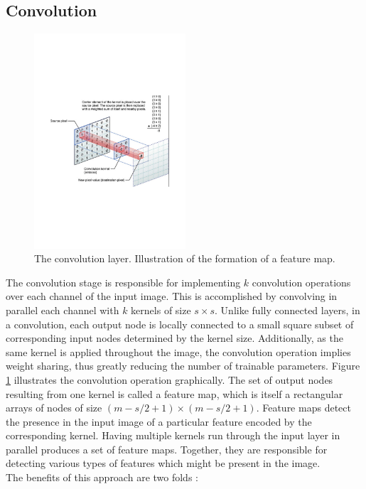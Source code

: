 \subsection{Convolution}

\begin{figure}
\centering
\label{convolution_operation}
\includegraphics[trim=2cm 7cm 2cm 7cm, clip=true, height=80mm]{Chapter2/convolution.pdf}
\caption{The convolution layer. Illustration of the formation of a feature map.}
\end{figure}

\noindent The convolution stage is responsible for implementing $k$ convolution operations over each channel of the input image. This is accomplished by convolving in parallel each channel with $k$ kernels of size $s \times s$. Unlike fully connected layers, in a convolution, each output node is locally connected to a small square subset of corresponding input nodes determined by the kernel size. Additionally, as the same kernel is applied throughout the image, the convolution operation implies weight sharing, thus greatly reducing the number of trainable parameters. Figure \ref{convolution_operation} illustrates the convolution operation graphically. The set of output nodes resulting from one kernel is called a feature map, which is itself a rectangular arrays of nodes of size $(m - s/2 + 1) \times (m - s/2 + 1)$. Feature maps detect the presence in the input image of a particular feature encoded by the corresponding kernel. Having multiple kernels run through the input layer in parallel produces a set of feature maps. Together, they are responsible for detecting various types of features which might be present in the image. \\

\noindent The benefits of this approach are two folds :

